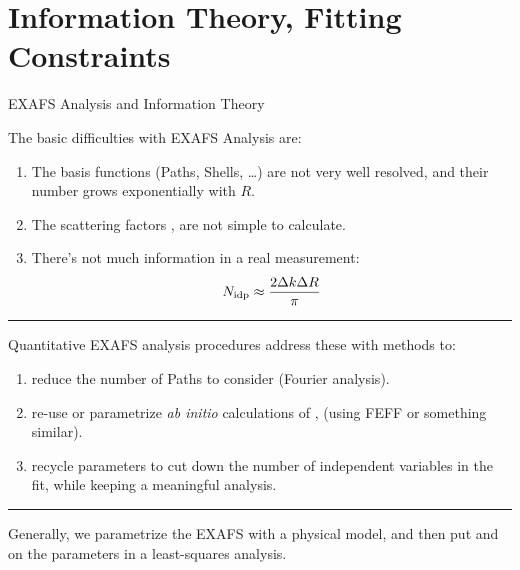 \section{Information Theory,  Fitting Constraints}

 \begin{slide}
   \small
   \begin{cenpage}{80mm}\setlength{\baselineskip}{10pt}
     \vfill
     \begin{center}
     {\Huge{}}
 
     \end{center}
     \vfill
   \end{cenpage}
 \end{slide} 

\begin{slide}{EXAFS Analysis and Information Theory}
    
    The basic difficulties with EXAFS Analysis are:

    \begin{enumerate}
    \item The basis functions (Paths, Shells, \ldots) are not very well
      resolved, and their number grows exponentially with $R$.

    \item The scattering factors ,  are not simple to
      calculate.
      
    \item There's not much information in a real measurement:
      \[ N_{\rm idp} \approx \frac{2\Delta k\Delta R}{\pi} \]
      
    \end{enumerate}
    
    \hrule \vmm
    
    Quantitative EXAFS analysis procedures address these with methods to:
    
    \begin{enumerate}
    \item {reduce} the number of Paths to consider (Fourier analysis).

    \item re-use or parametrize {\emph{ab initio}} calculations of
      ,  (using {\scshape{FEFF}} or something similar).
      
      
    \item recycle parameters to cut down the number of independent
      variables in the fit, while keeping a meaningful analysis.
      
    \end{enumerate}

    \hrule \vmm
    
    Generally, we parametrize the EXAFS with a physical model, and then
    put {} and {} on the
    parameters in a least-squares analysis.

    \vmm
\vfill
\end{slide} 


